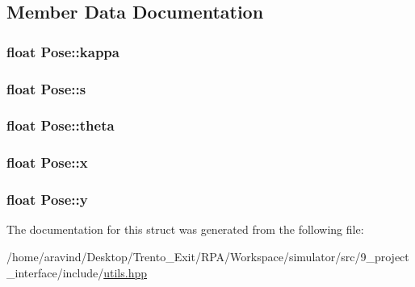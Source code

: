 \subsection{Member Data Documentation}
\subsubsection[{\texorpdfstring{kappa}{kappa}}]{\setlength{\rightskip}{0pt plus 5cm}float Pose\+::kappa}\hypertarget{structPose_a4f409e1fe4ae5626042bc2942df9367a}{}\label{structPose_a4f409e1fe4ae5626042bc2942df9367a}
\subsubsection[{\texorpdfstring{s}{s}}]{\setlength{\rightskip}{0pt plus 5cm}float Pose\+::s}\hypertarget{structPose_a7cafd5a1122c053e9c1ddec351dbb8f3}{}\label{structPose_a7cafd5a1122c053e9c1ddec351dbb8f3}
\subsubsection[{\texorpdfstring{theta}{theta}}]{\setlength{\rightskip}{0pt plus 5cm}float Pose\+::theta}\hypertarget{structPose_a2e2edc8448a8f6f4a21cbd7eca63c2ff}{}\label{structPose_a2e2edc8448a8f6f4a21cbd7eca63c2ff}
\subsubsection[{\texorpdfstring{x}{x}}]{\setlength{\rightskip}{0pt plus 5cm}float Pose\+::x}\hypertarget{structPose_a2f30fe76d6747d973daff013207ca0e8}{}\label{structPose_a2f30fe76d6747d973daff013207ca0e8}
\subsubsection[{\texorpdfstring{y}{y}}]{\setlength{\rightskip}{0pt plus 5cm}float Pose\+::y}\hypertarget{structPose_a60610dad0457edf9e1c57a787b68b632}{}\label{structPose_a60610dad0457edf9e1c57a787b68b632}


The documentation for this struct was generated from the following file\+:\begin{DoxyCompactItemize}
\item 
/home/aravind/\+Desktop/\+Trento\+\_\+\+Exit/\+R\+P\+A/\+Workspace/simulator/src/9\+\_\+project\+\_\+interface/include/\hyperlink{utils_8hpp}{utils.\+hpp}\end{DoxyCompactItemize}
